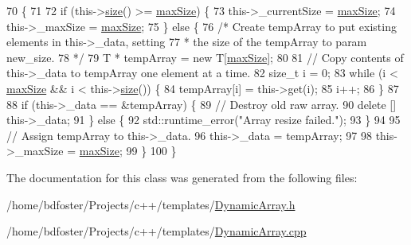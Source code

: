 \begin{DoxyCode}
70 \{
71 
72     \textcolor{keywordflow}{if} (this->\hyperlink{a00001_aeed263e1e987901c8cc2c1e1d3102d73}{size}() >= \hyperlink{a00002_aeb1916d4d9cf7db37df86cb7a603c198}{maxSize}) \{
73         this->\_currentSize = \hyperlink{a00002_aeb1916d4d9cf7db37df86cb7a603c198}{maxSize};
74         this->\_maxSize = \hyperlink{a00002_aeb1916d4d9cf7db37df86cb7a603c198}{maxSize};
75     \} \textcolor{keywordflow}{else} \{
76         \textcolor{comment}{/* Create tempArray to put existing elements in this->\_data, setting}
77 \textcolor{comment}{         * the size of the tempArray to param new\_size.}
78 \textcolor{comment}{         */}
79         T * tempArray = \textcolor{keyword}{new} T[\hyperlink{a00002_aeb1916d4d9cf7db37df86cb7a603c198}{maxSize}];
80 
81         \textcolor{comment}{// Copy contents of this->\_data to tempArray one element at a time.}
82         \textcolor{keywordtype}{size\_t} i = 0;
83         \textcolor{keywordflow}{while} (i < \hyperlink{a00002_aeb1916d4d9cf7db37df86cb7a603c198}{maxSize} && i < this->\hyperlink{a00001_aeed263e1e987901c8cc2c1e1d3102d73}{size}()) \{
84             tempArray[i] = this->\textcolor{keyword}{get}(i);
85             i++;
86         \}
87 
88         \textcolor{keywordflow}{if} (this->\_data == &tempArray) \{
89             \textcolor{comment}{// Destroy old raw array.}
90             \textcolor{keyword}{delete} [] this->\_data;
91         \} \textcolor{keywordflow}{else} \{
92             std::runtime\_error(\textcolor{stringliteral}{"Array resize failed."});
93         \}
94 
95         \textcolor{comment}{// Assign tempArray to this->\_data.}
96         this->\_data = tempArray;
97         
98         this->\_maxSize = \hyperlink{a00002_aeb1916d4d9cf7db37df86cb7a603c198}{maxSize};
99     \}
100 \}
\end{DoxyCode}


The documentation for this class was generated from the following files\+:\begin{DoxyCompactItemize}
\item 
/home/bdfoster/\+Projects/c++/templates/\hyperlink{a00006}{Dynamic\+Array.\+h}\item 
/home/bdfoster/\+Projects/c++/templates/\hyperlink{a00005}{Dynamic\+Array.\+cpp}\end{DoxyCompactItemize}
